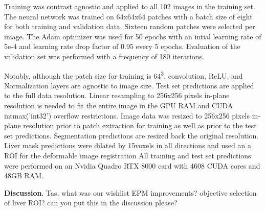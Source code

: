 \documentclass{article}         %
\theoremstyle{definition}
\theoremstyle{remark}
\begin{document}
Training was contrast agnostic \cite{thakur2020brain} and applied to all 102 images in the
training set. The neural network was trained on 64x64x64 patches with a batch size of
eight for both training and validation data. Sixteen random patches were selected  per
image.  The Adam optimizer was used for 50 epochs with an intial learning rate of 5e-4 and
learning rate drop factor of 0.95 every 5 epochs. Evaluation of the validation set was
performed with a frequency of 180 iterations.

Notably, although the patch size for training is 64\textsuperscript{3},
convolution, ReLU, and Normalization layers are agnostic to image size. 
Test set predictions are applied to the full data resolution.
Linear resampling to 256x256 pixels in-plane resolution is needed to fit the entire image in the GPU RAM
and CUDA intmax('int32') overflow restrictions.
Image data  was resized to 256x256 pixels in-plane resolution prior to patch extraction for
training as well as prior to the test set predictions.
Segmentation predictions are resized back the original resolution.
Liver mask predictions were dilated by 15voxels in all directions and used an a ROI for the deformable image registration
All training and test set predictions were performed on an Nvidia Quadro RTX 8000 card with 4608 CUDA cores and 48GB RAM.

\textbf{Discussion}.  Tas, what was our wishlist EPM improvements? objective selection of
liver ROI? can you put this in the discussion please? 




\end{document}
